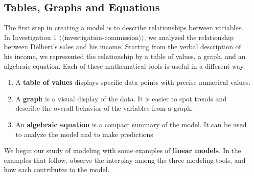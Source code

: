 \documentclass[10pt,]{book}
\newcommand{\terminology}[1]{\textbf{#1}}
\theoremstyle{plain}
\theoremstyle{definition}
\theoremstyle{definition}
\numberwithin{equation}{section}
\begin{document}
\subsection[Tables, Graphs and Equations]{Tables, Graphs and Equations}\label{subsection-1}
The first step in creating a model is to describe relationships between variables.  In Investigation 1 {$\langle\langle$investigation-commission$\rangle\rangle$}, we analyzed the relationship between Delbert's sales and his income.  Starting from the verbal description of his income, we represented the relationship by a table of values, a graph, and an algebraic equation.  Each of these mathematical tools is useful in a different way.%
\leavevmode%
\begin{enumerate}
\item\hypertarget{li-10}{}A \terminology{table of values} displays specific data points with precise numerical values.%
\item\hypertarget{li-11}{}A \terminology{graph} is a visual display of the data.  It is easier to spot trends and describe the overall behavior of the variables from a graph.%
\item\hypertarget{li-12}{}An \terminology{algebraic equation} is a compact summary of the model.  It can be used to analyze the model and to make predictions%
\end{enumerate}
\par
We begin our study of modeling with some examples of \terminology{linear models}.  In the examples that follow, observe the interplay among the three modeling tools, and how each contributes to the model.%
\end{document}
